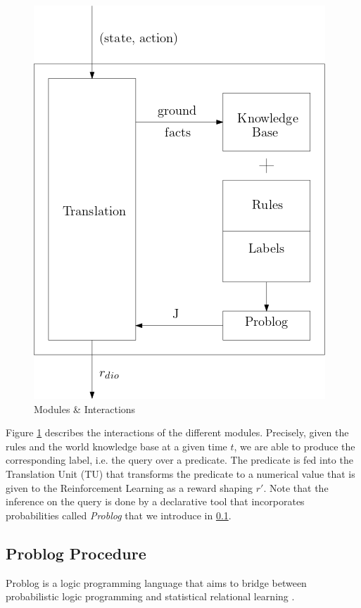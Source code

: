 \begin{figure}[H]
  \centering
  \includegraphics[scale=0.4]{figures/dynamics.png}
  \caption{Modules \& Interactions}
  \label{fig:mods}
\end{figure}

Figure \ref{fig:mods} describes the interactions of the different
modules. Precisely, given the rules and the world knowledge base at a
given time $t$, we are able to produce the corresponding label, i.e.
the query over a predicate. The predicate is fed into the Translation
Unit (TU) that transforms the predicate to a numerical value that is
given to the Reinforcement Learning as a reward shaping $r'$. Note
that the inference on the query is done by a declarative tool that
incorporates probabilities called \emph{Problog} that we introduce in
\ref{sec:problog}.


\subsection{Problog Procedure} 
\label{sec:problog}
Problog is a logic programming language that aims to bridge between probabilistic 
logic programming and statistical relational learning \cite{fierens_van}. 

